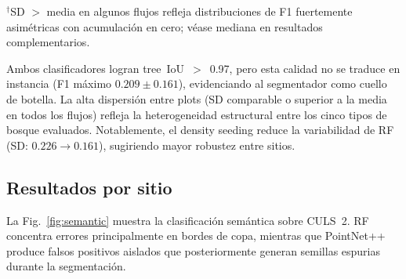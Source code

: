 \documentclass[runningheads]{llncs}
\begin{document}
\begin{table}[H]
\centering
\caption{Resultados de segmentaci\'on de instancias (test, IoU~3D~$\geq 0.5$, media $\pm$ SD sobre $n=11$~plots).}\label{tab:results-inst}
\vspace{1mm}
{\footnotesize $^\dagger$SD $>$ media en algunos flujos refleja distribuciones de F1 fuertemente asim\'etricas con acumulaci\'on en cero; v\'ease mediana en resultados complementarios.}
\end{table}

Ambos clasificadores logran tree~IoU~$>$~0.97, pero esta calidad no se traduce en instancia (F1 m\'aximo $0.209 \pm 0.161$), evidenciando al segmentador como cuello de botella. La alta dispersi\'on entre plots (SD comparable o superior a la media en todos los flujos) refleja la heterogeneidad estructural entre los cinco tipos de bosque evaluados. Notablemente, el density seeding reduce la variabilidad de RF (SD: $0.226 \rightarrow 0.161$), sugiriendo mayor robustez entre sitios.

\subsection{Resultados por sitio}

La Fig.~\ref{fig:semantic} muestra la clasificaci\'on sem\'antica sobre CULS~2. RF concentra errores principalmente en bordes de copa, mientras que PointNet++ produce falsos positivos aislados que posteriormente generan semillas espurias durante la segmentación.
\end{document}
